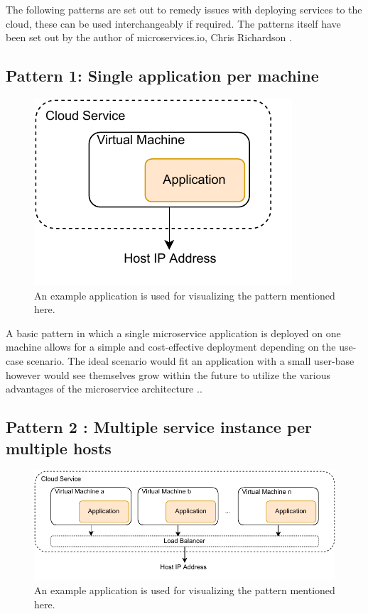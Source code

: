 The following patterns are set out to remedy issues with deploying services to the cloud, these can be used interchangeably if required. The patterns itself have been set out by the author of microservices.io, Chris Richardson \cite{Chr19}. 

\subsection{Pattern 1: Single application per machine}
    \begin{figure}[H]
        \centering
        \includegraphics[width=0.45\linewidth]{images/Pattern-1.pdf}
        \caption{An example application is used for visualizing the pattern mentioned here.}
    \end{figure}  

A basic pattern in which a single microservice application is deployed on one machine allows for a simple and cost-effective deployment depending on the use-case scenario. The ideal scenario would fit an application with a small user-base however would see themselves grow within the future to utilize the various advantages of the microservice architecture \cite{Chr19}.. 

\subsection{Pattern 2 : Multiple service instance per multiple hosts}
    \begin{figure}[H]
        \centering
        \includegraphics[width=0.9\linewidth]{images/Pattern-2.pdf}
        \caption{An example application is used for visualizing the pattern mentioned here.}
    \end{figure}  

